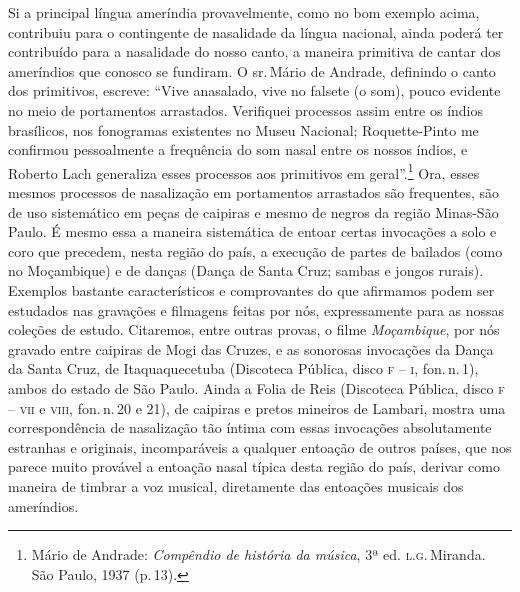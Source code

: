 Si a principal língua ameríndia provavelmente, como no bom exemplo
acima, contribuiu para o contingente de nasalidade da língua nacional,
ainda poderá ter contribuído para a nasalidade do nosso canto, a maneira
primitiva de cantar dos ameríndios que conosco se fundiram. O sr.\,Mário
de Andrade, definindo o canto dos primitivos, escreve: ``Vive anasalado,
vive no falsete (o som), pouco evidente no meio de portamentos
arrastados. Verifiquei processos assim entre os índios brasílicos, nos
fonogramas existentes no Museu Nacional; Roquette-Pinto me confirmou
pessoalmente a frequência do som nasal entre os nossos índios, e Roberto
Lach generaliza esses processos aos primitivos em geral''.\footnote{Mário de Andrade: \emph{Compêndio de história da música}, 3ª ed. \textsc{l.g.}\,Miranda. São Paulo, 1937 (p.\,13).} Ora,
esses mesmos processos de nasalização em portamentos arrastados são
frequentes, são de uso sistemático em peças de caipiras e mesmo de
negros da região Minas-São Paulo. É mesmo essa a maneira sistemática de
entoar certas invocações a solo e coro que precedem, nesta região do
país, a execução de partes de bailados (como no Moçambique) e de danças
(Dança de Santa Cruz; sambas e jongos rurais). Exemplos bastante
característicos e comprovantes do que afirmamos podem ser estudados nas
gravações e filmagens feitas por nós, expressamente para as nossas
coleções de estudo. Citaremos, entre outras provas, o filme \textit{Moçambique},
por nós gravado entre caipiras de Mogi das Cruzes, e as sonorosas
invocações da Dança da Santa Cruz, de Itaquaquecetuba (Discoteca
Pública, disco \textsc{f} -- \textsc{i}, fon.\,n.\,1), ambos do estado de São Paulo. Ainda a
Folia de Reis (Discoteca Pública, disco \textsc{f} -- \textsc{vii} e \textsc{viii}, fon.\,n.\,20 e 21), de
caipiras e pretos mineiros de Lambari, mostra uma correspondência de
nasalização tão íntima com essas invocações absolutamente estranhas e
originais, incomparáveis a qualquer entoação de outros países, que nos
parece muito provável a entoação nasal típica desta região do país,
derivar como maneira de timbrar a voz musical, diretamente das entoações
musicais dos ameríndios.

